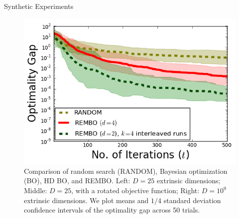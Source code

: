 \documentclass[final]{beamer}
\begin{document}
\begin{frame}[t]
\begin{columns}[T]
\begin{column}{.48\textwidth}
\begin{block}{Synthetic Experiments}
\begin{figure}[t!]
  \includegraphics[scale=0.9]{../paper/figures/branin_dis_1b.png}
  \caption{Comparison of random search (RANDOM), Bayesian optimization (BO),
   HD BO, and REMBO.
Left: $D=25$ extrinsic dimensions; Middle: $D=25$, with a rotated objective function; Right: $D=10^9$ extrinsic dimensions. We plot means and $1/4$ standard deviation confidence intervals of the optimality gap across 50 trials.}
  \label{fig:standard}
\end{figure}
\end{block}


\end{column}
\end{columns}
\end{frame}
\end{document}
